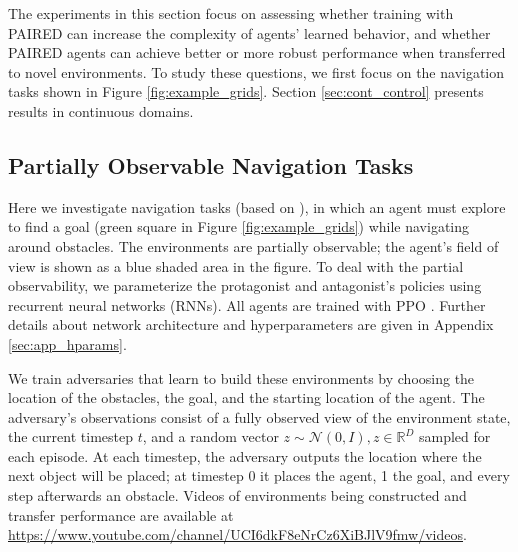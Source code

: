 \documentclass{article}
\begin{document}
The experiments in this section focus on assessing whether training with PAIRED can increase the complexity of agents' learned behavior, and whether PAIRED agents can achieve better or more robust performance when transferred to novel environments. To study these questions, we first focus on the navigation tasks shown in Figure \ref{fig:example_grids}. Section \ref{sec:cont_control} presents results in continuous domains.

\subsection{Partially Observable Navigation Tasks}
Here we investigate navigation tasks (based on \citep{gym_minigrid}), in which an agent must explore to find a goal (green square in Figure \ref{fig:example_grids}) while navigating around obstacles. The environments are partially observable; the agent's field of view is shown as a blue shaded area in the figure. To deal with the partial observability, we parameterize the protagonist and antagonist's policies using recurrent neural networks (RNNs). All agents are trained with PPO \citep{schulman2017proximal}. Further details about network architecture and hyperparameters are given in Appendix \ref{sec:app_hparams}.



We train adversaries that learn to build these environments by choosing the location of the obstacles, the goal, and the starting location of the agent. The adversary's observations consist of a fully observed view of the environment state, the current timestep $t$, and a random vector $z \sim \mathcal{N}(0,I), z \in \mathbb{R}^D$ sampled for each episode. At each timestep, the adversary outputs the location where the next object will be placed; at timestep 0 it places the agent, 1 the goal, and every step afterwards an obstacle. Videos of environments being constructed and transfer performance are available at \url{https://www.youtube.com/channel/UCI6dkF8eNrCz6XiBJlV9fmw/videos}.
\end{document}
